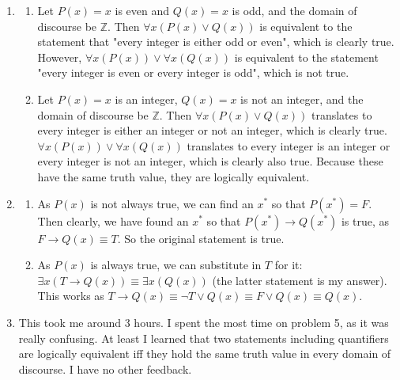 \documentclass[12pt]{article}
\def\mbb#1{\mathbb{#1}}
\def\bZ{\mbb{Z}}
\theoremstyle{definition}
\theoremstyle{remark}
\newcommand{\ra}{\rightarrow}
\begin{document}
\begin{enumerate}[leftmargin=\labelsep]
	\newpage
	\item
	\begin{enumerate}
		\item Let $P(x) = x$ is even and $Q(x) = x$ is odd, and the domain of discourse be $\bZ$. Then $\forall x(P(x) \lor Q(x))$ is equivalent to the statement that "every integer is either odd or even", which is clearly true. However, $\forall x (P(x)) \lor \forall x (Q(x))$ is equivalent to the statement "every integer is even or every integer is odd", which is not true. 
		\item Let $P(x) = x$ is an integer, $Q(x) = x$ is not an integer, and the domain of discourse be $\bZ$. Then $\forall x(P(x) \lor Q(x))$ translates to every integer is either an integer or not an integer, which is clearly true. $\forall x (P(x)) \lor \forall x(Q(x))$ translates to every integer is an integer or every integer is not an integer, which is clearly also true. Because these have the same truth value, they are logically equivalent.
	\end{enumerate}

	\newpage
	\item 
	\begin{enumerate}
		\item As $P(x)$ is not always true, we can find an $x^*$ so that $P(x^*) = F$. Then clearly, we have found an $x^*$ so that $P(x^*) \ra Q(x^*)$ is true, as $F \ra Q(x) \equiv T$. So the original statement is true.
		\item As $P(x)$ is always true, we can substitute in $T$ for it: $\exists x (T \ra Q(x)) \equiv \exists x (Q(x))$ (the latter statement is my answer). This works as $T \ra Q(x) \equiv \lnot T \lor Q(x) \equiv F \lor Q(x) \equiv Q(x)$.
	\end{enumerate}

	\newpage
	\item This took me around 3 hours. I spent the most time on problem 5, as it was really confusing. At least I learned that two statements including quantifiers are logically equivalent iff they hold the same truth value in every domain of discourse. I have no other feedback.
	\end{enumerate}
\end{document}
